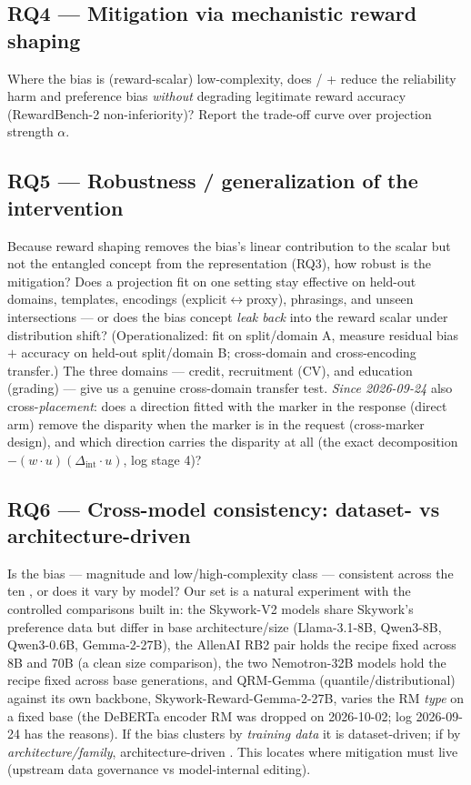 \documentclass{article}
\begin{document}
\subsection{RQ4 --- Mitigation via mechanistic reward shaping}
Where the bias is (reward-scalar) low-complexity, does \diffmean{}/\leace{} + \nullspace{} reduce the
reliability harm and preference bias \emph{without} degrading legitimate reward accuracy (RewardBench-2
non-inferiority)? Report the trade-off curve over projection strength $\alpha$.

\subsection{RQ5 --- Robustness / generalization of the intervention}
Because reward shaping removes the bias's linear contribution to the scalar but not the entangled concept
from the representation (RQ3), how robust is the mitigation? Does a projection fit on one setting stay
effective on held-out domains, templates, encodings (explicit$\leftrightarrow$proxy), phrasings, and
unseen intersections --- or does the bias concept \emph{leak back} into the reward scalar under
distribution shift? (Operationalized: fit on split/domain A, measure residual bias $+$ accuracy on
held-out split/domain B; cross-domain and cross-encoding transfer.) The three domains --- credit,
recruitment (CV), and education (grading) --- give us a genuine cross-domain transfer test. \emph{Since
2026-09-24} also cross-\emph{placement}: does a direction fitted with the marker in the response (direct
arm) remove the disparity when the marker is in the request (cross-marker design), and which direction
carries the disparity at all (the exact decomposition $-(w\cdot u)(\Delta_\text{int}\cdot u)$, log stage 4)?

\subsection{RQ6 --- Cross-model consistency: dataset- vs architecture-driven}
Is the bias --- magnitude and low/high-complexity class --- consistent across the ten \RMs{}, or does it
vary by model? Our set is a natural experiment with the controlled comparisons built in: the Skywork-V2
models share Skywork's preference data but differ in base architecture/size (Llama-3.1-8B, Qwen3-8B,
Qwen3-0.6B, Gemma-2-27B), the AllenAI RB2 pair holds the recipe fixed across 8B and 70B (a clean size
comparison), the two Nemotron-32B models hold the recipe fixed across base generations, and QRM-Gemma
(quantile/distributional) against its own backbone, Skywork-Reward-Gemma-2-27B, varies the RM \emph{type} on a fixed
base (the DeBERTa encoder RM was dropped on 2026-10-02; log 2026-09-24 has the reasons).
If the bias clusters by \emph{training data} it is
dataset-driven; if by \emph{architecture/family}, architecture-driven \citep{kumar2025prefix}. This
locates where mitigation must live (upstream data governance vs model-internal editing).
\end{document}
